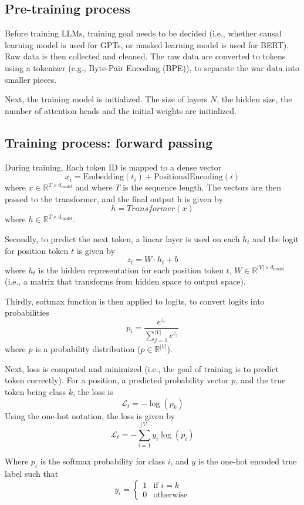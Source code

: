 \documentclass{article} %
\begin{document}
\subsection{Pre-training process}
Before training LLMs, training goal needs to be decided (i.e., whether causal learning model is used for GPTs, or masked learning model is used for BERT). Raw data is then collected and cleaned. The raw data are converted to tokens using a tokenizer (e.g., Byte-Pair Encoding (BPE)), to separate the war data into smaller pieces. 

Next, the training model is initialized. The size of layers $N$, the hidden size, the number of attention heads and the initial weights are initialized. 

\subsection{Training process: forward passing}
During training, Each token ID is mapped to a dense vector
    \[
    x_i = \text{Embedding}(t_i) + \text{PositionalEncoding}(i)
    \]
where $x \in \mathbb{R}^{T \times d_{\text{model}}}$ and where $T$ is the sequence length. The vectors are then passed to the transformer, and the final output h is given by
\[h=Transformer(x)\]
where \(h \in \mathbb{R}^{T \times d_{\text{model}}} \).

Secondly, to predict the next token, a linear layer is used on each \(h_t\) and the logit for position token $t$ is given by
\[
z_t = W \cdot h_t + b
\]
where $h_t$ is the hidden representation for each position token $t$, \( W \in \mathbb{R}^{|V| \times d_{\text{model}}} \) (i.e., a matrix that transforms from hidden space to output space).

Thirdly, softmax function is then applied to logits, to convert logits into probabilities
\[
p_i = \frac{e^{z_i}}{\sum\limits_{j=1}^{|V|} e^{z_j}}
\]
where $p$ is a probability distribution ($p \in \mathbb{R}^{|V|}$).

Next, loss is computed and minimized (i.e., the goal of training is to predict token correctly). For a position, a predicted probability vector $p$, and the true token being class $k$, the loss is
\[
\mathcal{L}_t = -\log(p_k)
\]
Using the one-hot notation, the loss is given by
\[
\mathcal{L}_t = -\sum_{i=1}^{|V|} y_i \log(p_i)
\]

Where \( p_i \) is the softmax probability for class \( i \), and \( y \) is the one-hot encoded true label such that
\[
    y_i = \begin{cases}
    1 & \text{if } i = k  \\
    0 & \text{otherwise}
    \end{cases}
    \]
\end{document}
